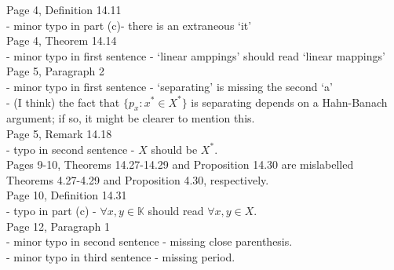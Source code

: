 \documentclass[11pt]{article}
\newcommand{\K}{\mathbb{K}}                         %
\begin{document}
Page 4, Definition 14.11 \\
    - minor typo in part (c)- there is an extraneous `it'  \\

Page 4, Theorem 14.14 \\
    - minor typo in first sentence - `linear amppings' should read `linear mappings'  \\

\newpage
Page 5, Paragraph 2 \\
    - minor typo in first sentence - `separating' is missing the second `a' \\
    - (I think) the fact that $\{p_x : x^* \in X^*\}$ is separating depends on
        a Hahn-Banach argument; if so, it might be clearer to mention this. \\

Page 5, Remark 14.18 \\
    - typo in second sentence - $X$ should be $X^*$.    \\

Pages 9-10, Theorems 14.27-14.29 and Proposition 14.30 are mislabelled Theorems
4.27-4.29 and Proposition 4.30, respectively.   \\

Page 10, Definition 14.31\\
    - typo in part (c) - $\forall x,y \in \K$ should read $\forall x,y \in X$.
    \\

Page 12, Paragraph 1\\
    - minor typo in second sentence - missing close parenthesis. \\
    - minor typo in third sentence - missing period.    \\
\end{document}
